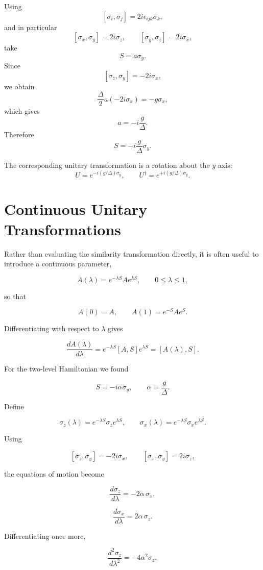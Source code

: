 \documentclass[11pt]{article}
\begin{document}
Using
\[
[\sigma_i,\sigma_j]
=
2i\epsilon_{ijk}\sigma_k,
\]
and in particular
\[
[\sigma_x,\sigma_y]=2i\sigma_z,
\qquad
[\sigma_y,\sigma_z]=2i\sigma_x,
\]
take
\[
S=a\sigma_y.
\]
Since
\[
[\sigma_z,\sigma_y]
=
-2i\sigma_x,
\]
we obtain
\[
\frac{\Delta}{2}
a(-2i\sigma_x)
=
-g\sigma_x,
\]
which gives
\[
\boxed{
a=-i\frac{g}{\Delta}
}.
\]
Therefore
\[
S
=
-i\frac{g}{\Delta}\sigma_y.
\]

The corresponding unitary transformation is a rotation about the $y$ axis:
\[
U
=
e^{-i(g/\Delta)\sigma_y},
\qquad
U^\dagger
=
e^{+i(g/\Delta)\sigma_y}.
\]



\section{Continuous Unitary Transformations}

Rather than evaluating the similarity transformation directly, it is often
useful to introduce a continuous parameter,

\[
A(\lambda)
=
e^{-\lambda S}Ae^{\lambda S},
\qquad
0\le\lambda\le1,
\]

so that

\[
A(0)=A,
\qquad
A(1)=e^{-S}Ae^{S}.
\]

Differentiating with respect to $\lambda$ gives

\[
\frac{dA(\lambda)}{d\lambda}
=
e^{-\lambda S}[A,S]e^{\lambda S}
=
[A(\lambda),S].
\]

For the two-level Hamiltonian we found

\[
S=-i\alpha\sigma_y,
\qquad
\alpha=\frac{g}{\Delta}.
\]

Define

\[
\sigma_z(\lambda)
=
e^{-\lambda S}\sigma_z e^{\lambda S},
\qquad
\sigma_x(\lambda)
=
e^{-\lambda S}\sigma_x e^{\lambda S}.
\]

Using

\[
[\sigma_z,\sigma_y]=-2i\sigma_x,
\qquad
[\sigma_x,\sigma_y]=2i\sigma_z,
\]

the equations of motion become

\[
\frac{d\sigma_z}{d\lambda}
=
-2\alpha\,\sigma_x,
\]

\[
\frac{d\sigma_x}{d\lambda}
=
2\alpha\,\sigma_z.
\]

Differentiating once more,

\[
\frac{d^2\sigma_z}{d\lambda^2}
=
-4\alpha^2\sigma_z,
\]
\end{document}
